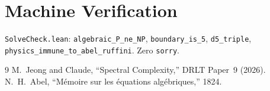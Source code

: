 \documentclass[12pt]{article}
\theoremstyle{remark}
\begin{document}
\section{Machine Verification}

\texttt{SolveCheck.lean}: \texttt{algebraic\_P\_ne\_NP},
\texttt{boundary\_is\_5}, \texttt{d5\_triple},
\texttt{physics\_immune\_to\_abel\_ruffini}.
Zero \texttt{sorry}.

\begin{thebibliography}{9}
 M.~Jeong and Claude, ``Spectral Complexity,''
  DRLT Paper~9 (2026).
 N.~H.~Abel, ``M\'emoire sur les \'equations
  alg\'ebriques,'' 1824.
\end{thebibliography}
\end{document}

